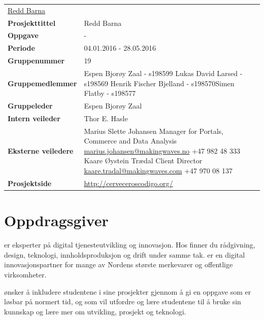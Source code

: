 \begin{flushleft}
\begin{tabular}[ht]{@{}lp{100mm}@{}}
\href{http://www.reddbarna.no/}{Redd Barna} \\
\textbf{Prosjekttittel} & Redd Barna \\ 
\textbf{Oppgave} & - \\ 
\textbf{Periode} & 04.01.2016 - 28.05.2016 \\ 
\textbf{Gruppenummer} & 19 \\ 
\textbf{Gruppemedlemmer} & Espen Bjorøy Zaal - s198599 \newline Lukas David Larsed - s198569 \newline Henrik Fischer Bjelland - s198570\newline Simen Flatby - s198577 \\ 
\textbf{Gruppeleder} & Espen Bjorøy Zaal \\ 
\textbf{Intern veileder} & Thor E. Hasle \\ 
\textbf{Eksterne veiledere} & Marius Slette Johansen \newline Manager for Portals, Commerce and Data Analysis \newline \href{mailto:marius.johansen@makingwaves.no}{marius.johansen@makingwaves.no} \newline +47 982 48 333 \newline \newline Kaare Øystein Trædal \newline Client Director \newline \href{mailto:kaare.tradal@makingwaves.com}{kaare.tradal@makingwaves.com} \newline +47 970 08 137 \\
\textbf{Prosjektside} & \url{http://cerveceroscodigo.org/} \\
\end{tabular} 
\end{flushleft}

\section{Oppdragsgiver}
\mw{} er eksperter på digital tjenesteutvikling og innovasjon. Hos \mw{} finner du rådgivning, design, teknologi, innholdsproduksjon og drift under samme tak. \mw{} er en digital innovasjonspartner for mange av Nordens største merkevarer og offentlige virksomheter.

\mw{} ønsker å inkludere studentene i sine prosjekter gjennom å gi en oppgave som er løsbar på normert tid, og som vil utfordre og lære studentene til å bruke sin kunnskap og lære mer om utvikling, prosjekt og teknologi.

